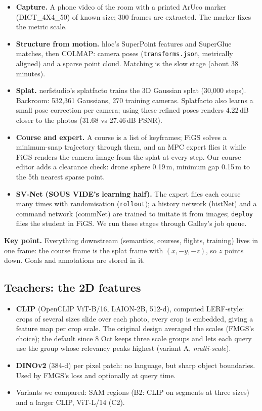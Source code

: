 \documentclass[11pt,a4paper]{article}
\newcommand{\keypt}[1]{\begin{key}\sffamily\small\textbf{Key point.} #1\end{key}}
\begin{document}
\begin{itemize}
  \item \textbf{Capture.} A phone video of the room with a printed ArUco marker (DICT\_4X4\_50) of known
    size; 300 frames are extracted. The marker fixes the metric scale.
  \item \textbf{Structure from motion.} hloc's SuperPoint features and SuperGlue matches, then COLMAP:
    camera poses (\texttt{transforms.json}, metrically aligned) and a sparse point cloud. Matching is the
    slow stage (about 38 minutes).
  \item \textbf{Splat.} nerfstudio's splatfacto trains the 3D Gaussian splat (30{,}000 steps). Backroom:
    532{,}361 Gaussians, 270 training cameras. Splatfacto also learns a small pose correction per camera;
    using these refined poses renders 4.22\,dB closer to the photos (31.68 vs 27.46\,dB PSNR).
  \item \textbf{Course and expert.} A course is a list of keyframes; FiGS solves a minimum-snap
    trajectory through them, and an MPC expert flies it while FiGS renders the camera image from the splat
    at every step. Our course editor adds a clearance check: drone sphere 0.19\,m, minimum gap 0.15\,m to
    the 5th nearest sparse point.
  \item \textbf{SV-Net (SOUS VIDE's learning half).} The expert flies each course many times with
    randomisation (\texttt{rollout}); a history network (histNet) and a command network (commNet) are
    trained to imitate it from images; \texttt{deploy} flies the student in FiGS. We run these stages
    through Galley's job queue.
\end{itemize}
\keypt{Everything downstream (semantics, courses, flights, training) lives in one frame: the course
frame is the splat frame with $(x, -y, -z)$, so $z$ points down. Goals and annotations are stored in it.}

\subsection{Teachers: the 2D features}\label{sec:teachers}
\begin{itemize}
  \item \textbf{CLIP} (OpenCLIP ViT-B/16, LAION-2B, 512-d), computed LERF-style: crops of several sizes
    slide over each photo, every crop is embedded, giving a feature map per crop scale. The original
    design averaged the scales (FMGS's choice); the default since 8 Oct keeps three scale groups and lets
    each query use the group whose relevancy peaks highest (variant A, \emph{multi-scale}).
  \item \textbf{DINOv2} (384-d) per pixel patch: no language, but sharp object boundaries. Used by FMGS's
    loss and optionally at query time.
  \item Variants we compared: SAM regions (B2: CLIP on segments at three sizes) and a larger CLIP,
    ViT-L/14 (C2).
\end{itemize}
\end{document}
